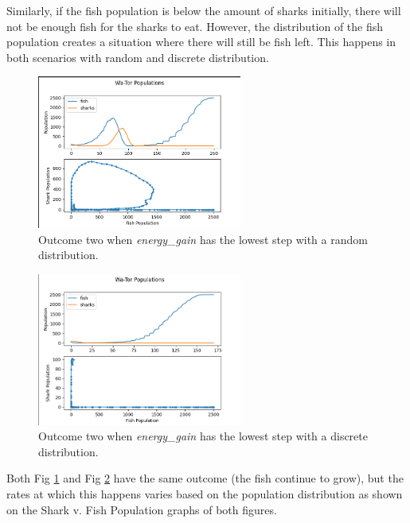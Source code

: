 \documentclass[12pt]{iopart} %
\begin{document}
Similarly, if the fish population is below the amount of sharks initially, there will not be enough fish for the sharks to eat. 
However, the distribution of the fish population creates a situation where there will still be fish left. 
This happens in both scenarios with random and discrete distribution.

\begin{figure}[h!tbp]
  \begin{center}
  \item[]\includegraphics[width=0.6\textwidth]{figure6.png}
  \caption{\label{fig:figure6}
  Outcome two when \emph{energy\_gain} has the lowest step with a random distribution.
  }
  \end{center}
\end{figure}

\begin{figure}[h!tbp]
  \begin{center}
  \item[]\includegraphics[width=0.6\textwidth]{figure7.png}
  \caption{\label{fig:figure7}
  Outcome two when \emph{energy\_gain} has the lowest step with a discrete distribution.
  }
  \end{center}
\end{figure}

Both Fig \ref{fig:figure6} and Fig \ref{fig:figure7} have the same outcome (the fish continue to grow), but the rates at which this happens varies based on the population distribution as shown on the Shark v. Fish Population graphs of both figures.
\end{document}
